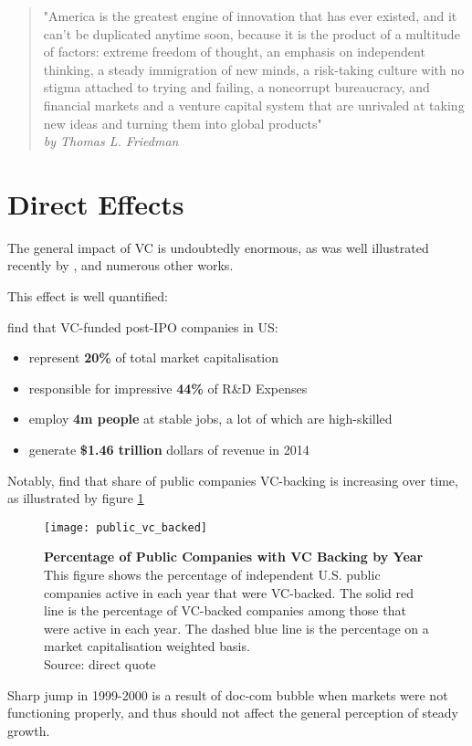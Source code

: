 
\begin{quote} 
    \centering 
        "America is the greatest engine of innovation that has ever existed, and it can't be duplicated anytime soon, because it is the product of a multitude of factors: extreme freedom of thought, an emphasis on independent thinking, a steady immigration of new minds, a risk-taking culture with no stigma attached to trying and failing, a noncorrupt bureaucracy, and financial markets and a venture capital system that are unrivaled at taking new ideas and turning them into global products"\\
    \raggedleft
        \emph{by Thomas L. Friedman}
\end{quote}

\section{Direct Effects}
    The general impact of VC is undoubtedly enormous, as was well illustrated recently by \parencite{gornall:2015}, \parencite{vc_ru_usa} and numerous other works.
    
    This effect is well quantified:
    
    \parencite{gornall:2015} find that VC-funded post-IPO companies in US:
    \begin{itemize}
        \item represent \textbf{20\%} of total market capitalisation
        \item responsible for impressive \textbf{44\%} of R\&D Expenses
        \item employ \textbf{4m people} at stable jobs, a lot of which are high-skilled
        \item generate \textbf{\$1.46 trillion} dollars of revenue in 2014
    \end{itemize}
    
    \newpage
    
    Notably, \parencite{gornall:2015} find that share of public companies VC-backing is increasing over time, as illustrated by figure \ref{fig:public_vc_backed}
    
    \begin{figure}[!htbp]
        \centering
        \texttt{[image: public\_vc\_backed]}
        \caption{ \textbf{Percentage of Public Companies with VC Backing by Year} \\This figure shows the percentage of independent U.S. public companies active in each year that were VC-backed. The solid red line is the percentage of VC-backed companies among those that were active in each year. The dashed blue line is the percentage on a market capitalisation weighted basis.\\Source: direct quote \parencite{gornall:2015}}
        \label{fig:public_vc_backed}
    \end{figure}
    Sharp jump in 1999-2000 is a result of doc-com bubble when markets were not functioning properly, and thus should not affect the general perception of steady growth.
    
